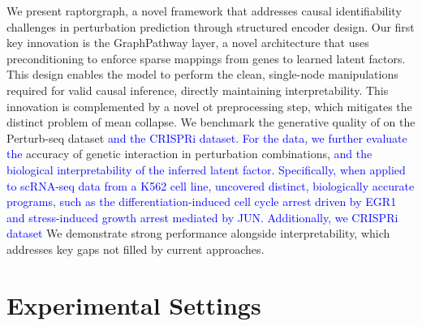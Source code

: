 \documentclass{article}
\begin{document}
We present \gls{raptorgraph}, a novel framework that addresses causal identifiability challenges in perturbation prediction through structured encoder design. 
Our first key innovation is the GraphPathway layer, a novel architecture that uses preconditioning to enforce sparse mappings from genes to learned latent factors. 
This design enables the model to perform the clean, single-node manipulations required for valid causal inference, directly maintaining interpretability.
This innovation is complemented by a novel \gls{ot} preprocessing step, which mitigates the distinct problem of mean collapse.
We benchmark the generative quality of  on the \citet{norman2019exploring} Perturb-seq dataset \textcolor{blue}{and the \citet{replogle_combinatorial_2020} CRISPRi dataset.
For the \citet{norman2019exploring} data, we further evaluate the} accuracy of genetic interaction in perturbation combinations, \textcolor{blue}{and the biological interpretability of the inferred latent factor.
Specifically, when applied to scRNA-seq data from a K562 cell line,  uncovered distinct, biologically accurate programs, such as the differentiation-induced cell cycle arrest driven by EGR1 and stress-induced growth arrest mediated by JUN.}
\textcolor{blue}{Additionally, we \citet{replogle_combinatorial_2020} CRISPRi dataset}
We demonstrate strong performance alongside interpretability, which addresses key gaps not filled by current approaches.





\section{Experimental Settings}
\label{sec:experiments}

\end{document}
